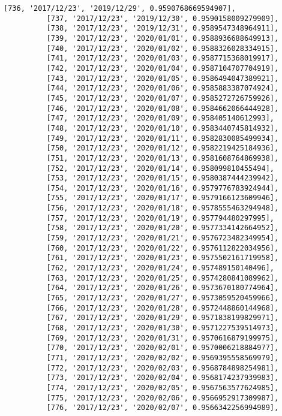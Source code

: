 \documentclass[11pt]{article}
\begin{document}
\begin{Verbatim}[commandchars=\\\{\}]
          [736, '2017/12/23', '2019/12/29', 0.9590768669594907],
          [737, '2017/12/23', '2019/12/30', 0.9590158009279909],
          [738, '2017/12/23', '2019/12/31', 0.9589547348964911],
          [739, '2017/12/23', '2020/01/01', 0.9588936688649913],
          [740, '2017/12/23', '2020/01/02', 0.9588326028334915],
          [741, '2017/12/23', '2020/01/03', 0.9587715368019917],
          [742, '2017/12/23', '2020/01/04', 0.9587104707704919],
          [743, '2017/12/23', '2020/01/05', 0.9586494047389921],
          [744, '2017/12/23', '2020/01/06', 0.9585883387074924],
          [745, '2017/12/23', '2020/01/07', 0.9585272726759926],
          [746, '2017/12/23', '2020/01/08', 0.9584662066444928],
          [747, '2017/12/23', '2020/01/09', 0.958405140612993],
          [748, '2017/12/23', '2020/01/10', 0.9583440745814932],
          [749, '2017/12/23', '2020/01/11', 0.9582830085499934],
          [750, '2017/12/23', '2020/01/12', 0.9582219425184936],
          [751, '2017/12/23', '2020/01/13', 0.9581608764869938],
          [752, '2017/12/23', '2020/01/14', 0.958099810455494],
          [753, '2017/12/23', '2020/01/15', 0.9580387444239942],
          [754, '2017/12/23', '2020/01/16', 0.9579776783924944],
          [755, '2017/12/23', '2020/01/17', 0.9579166123609946],
          [756, '2017/12/23', '2020/01/18', 0.9578555463294948],
          [757, '2017/12/23', '2020/01/19', 0.957794480297995],
          [758, '2017/12/23', '2020/01/20', 0.9577334142664952],
          [759, '2017/12/23', '2020/01/21', 0.9576723482349954],
          [760, '2017/12/23', '2020/01/22', 0.9576112822034956],
          [761, '2017/12/23', '2020/01/23', 0.9575502161719958],
          [762, '2017/12/23', '2020/01/24', 0.957489150140496],
          [763, '2017/12/23', '2020/01/25', 0.9574280841089962],
          [764, '2017/12/23', '2020/01/26', 0.9573670180774964],
          [765, '2017/12/23', '2020/01/27', 0.9573059520459966],
          [766, '2017/12/23', '2020/01/28', 0.9572448860144968],
          [767, '2017/12/23', '2020/01/29', 0.9571838199829971],
          [768, '2017/12/23', '2020/01/30', 0.9571227539514973],
          [769, '2017/12/23', '2020/01/31', 0.9570616879199975],
          [770, '2017/12/23', '2020/02/01', 0.9570006218884977],
          [771, '2017/12/23', '2020/02/02', 0.9569395558569979],
          [772, '2017/12/23', '2020/02/03', 0.9568784898254981],
          [773, '2017/12/23', '2020/02/04', 0.9568174237939983],
          [774, '2017/12/23', '2020/02/05', 0.9567563577624985],
          [775, '2017/12/23', '2020/02/06', 0.9566952917309987],
          [776, '2017/12/23', '2020/02/07', 0.9566342256994989],

\end{Verbatim}
\end{document}
